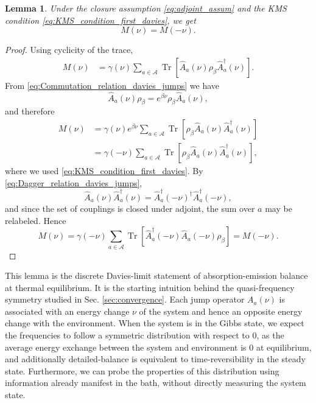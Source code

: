 \documentclass[showpacs,amsmath,amssymb,twocolumn,prx,superscriptaddress,10pt,aps,nofootinbib]{revtex4-2}
\newtheorem{lemma}{Lemma}
\begin{document}
\begin{lemma}
\label{lem:Davies_Mu}
Under the closure assumption \eqref{eq:adjoint_assum} and the KMS condition \eqref{eq:KMS_condition_first_davies}, we get
\begin{equation}
    M(\nu)=M(-\nu).
\end{equation}
\end{lemma}

\begin{proof}
Using cyclicity of the trace,
\begin{align}
    M(\nu)
    &=
    \gamma(\nu)\sum_{a\in\mathcal{A}}
    \operatorname{Tr}\!\left[\hat A_a(\nu)\rho_\beta \hat A_a^\dagger(\nu)\right].
\end{align}
From \eqref{eq:Commutation_relation_davies_jumps} we have
\[
\hat A_a(\nu)\rho_\beta=e^{\beta\nu}\rho_\beta \hat A_a(\nu),
\]
and therefore
\begin{align}
    M(\nu)
    &=
    \gamma(\nu)e^{\beta\nu}
    \sum_{a\in\mathcal{A}}
    \operatorname{Tr}\!\left[\rho_\beta \hat A_a(\nu)\hat A_a^\dagger(\nu)\right]
    \nonumber\\
    &=
    \gamma(-\nu)
    \sum_{a\in\mathcal{A}}
    \operatorname{Tr}\!\left[\rho_\beta \hat A_a(\nu)\hat A_a^\dagger(\nu)\right],
\end{align}
where we used \eqref{eq:KMS_condition_first_davies}. By \eqref{eq:Dagger_relation_davies_jumps},
\begin{equation}
\hat A_a(\nu)\hat A_a^\dagger(\nu)
=
\hat A_a^\dagger(-\nu)^\dagger\hat A_a^\dagger(-\nu),
\end{equation}
and since the set of couplings is closed under adjoint, the sum over $a$ may be relabeled. Hence
\begin{equation}
    M(\nu)
    =
    \gamma(-\nu)\sum_{a\in\mathcal{A}}
    \operatorname{Tr}\!\left[\hat A_a^\dagger(-\nu)\hat A_a(-\nu)\rho_\beta\right]
    =
    M(-\nu).
\end{equation}
\end{proof}

This lemma is the discrete Davies-limit statement of absorption-emission balance at thermal equilibrium. It is the starting intuition behind the quasi-frequency symmetry studied in Sec. \ref{sec:convergence}. Each jump operator $A_a(\nu)$ is associated with an energy change $\nu$ of the system and hence an opposite energy change with the environment. When the system is in the Gibbs state, we expect the frequencies to follow a symmetric distribution with respect to $0$, as the average energy exchange between the system and environment is $0$ at equilibrium, and additionally detailed-balance is equivalent to time-reversibility in the steady state. Furthermore, we can probe the properties of this distribution using information already manifest in the bath, without directly measuring the system state.
\end{document}
